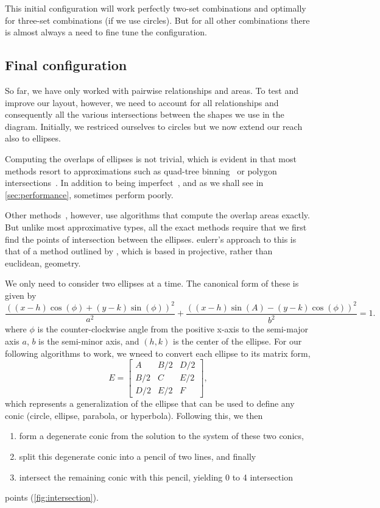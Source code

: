 \documentclass[
  a4paper,
  nofonts,
  nobib,
  titlepage,
  justified,
  marginals=raggedouter,
  nohyper
]{tufte-handout}\usepackage[]{graphicx}\usepackage[]{color}
\newcommand{\pkg}[1]{{\fontseries{b}\selectfont #1}}
\begin{document}
This initial configuration will work perfectly two-set combinations
and optimally for three-set combinations (if we use circles). But for all other
combinations there is almost always a need to fine tune the configuration.

\subsection{Final configuration}
\label{sec:finalConfig}

So far, we have only worked with pairwise relationships and areas. To
test and improve our layout, however, we need to account for all
relationships and consequently all the various intersections between the
shapes we use in the diagram. Initially, we restriced ourselves to circles but
we now extend our reach also to ellipses.

Computing the overlaps of ellipses is not trivial, which is evident in that
most methods resort to approximations such as quad-tree
binning~\citep{wilkinson_2012} or polygon intersections~\citep{kestler_2008}.
In addition to being imperfect~\citep{micallef_2013}, and as we shall see in
\cref{sec:performance}, sometimes perform poorly.

Other methods~\citep{micallef_2013,frederickson_2016}, however, use algorithms
that compute the overlap areas exactly. But unlike most approximative
types, all the exact methods require that we first find the points
of intersection between the ellipses. \pkg{eulerr}'s approach to this is that of
a method outlined by \citet{richter-gebert_2011}, which is based in
projective, rather than euclidean, geometry.

We only need to consider two ellipses at a time. The canonical form of these
is given by
\[
\frac{((x-h)\cos(\phi)+(y-k)\sin(\phi))^2}{a^2}+\frac{((x-h) \sin(A)-(y-k)
  \cos(\phi))^2}{b^2} = 1.
\]
where $\phi$ is the counter-clockwise angle from the positive x-axis to the
semi-major axis $a$, $b$ is the semi-minor axis, and $(h, k)$ is the center
of the ellipse. For our following algorithms to work, we wneed to convert each
ellipse to its matrix form,
\[
E = \begin{bmatrix}A & B/2 & D/2 \\
                   B/2 & C & E/2 \\
                   D/2 & E/2 & F
    \end{bmatrix},
\]
which represents a generalization of the ellipse that can be used to define any
conic (circle, ellipse, parabola, or hyperbola). Following  this, we then
\begin{enumerate}
\item form a degenerate conic from the solution to the system of these two conics,
\item split this degenerate conic into a pencil of two lines, and finally
\item intersect the remaining conic with this pencil, yielding 0 to 4 intersection
\end{enumerate}
points (\cref{fig:intersection}).
\end{document}

